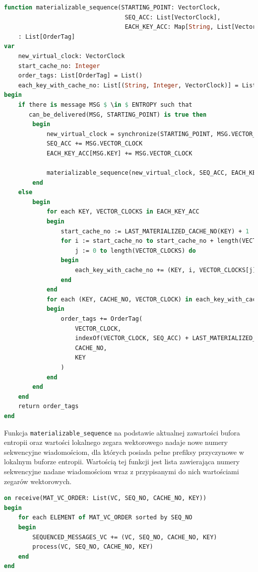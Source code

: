 \begin{lstlisting}[language=Pascal, caption=Pseudokod funkcji konstruującej listę nowych numerów sekwencyjnych wiadomościom z bufora entropii, mathescape=true]
function materializable_sequence(STARTING_POINT: VectorClock, 
                                  SEQ_ACC: List[VectorClock], 
                                  EACH_KEY_ACC: Map[String, List[VectorClock]])
    : List[OrderTag]
var
    new_virtual_clock: VectorClock
    start_cache_no: Integer
    order_tags: List[OrderTag] = List()
    each_key_with_cache_no: List[(String, Integer, VectorClock)] = List()
begin
    if there is message MSG $ \in $ ENTROPY such that 
       can_be_delivered(MSG, STARTING_POINT) is true then
        begin
            new_virtual_clock = synchronize(STARTING_POINT, MSG.VECTOR_CLOCK)
            SEQ_ACC += MSG.VECTOR_CLOCK
            EACH_KEY_ACC[MSG.KEY] += MSG.VECTOR_CLOCK
            
            materializable_sequence(new_virtual_clock, SEQ_ACC, EACH_KEY_ACC)
        end
    else
        begin
            for each KEY, VECTOR_CLOCKS in EACH_KEY_ACC
            begin
                start_cache_no := LAST_MATERIALIZED_CACHE_NO(KEY) + 1
                for i := start_cache_no to start_cache_no + length(VECTOR_CLOCKS),
                    j := 0 to length(VECTOR_CLOCKS) do
                begin
                    each_key_with_cache_no += (KEY, i, VECTOR_CLOCKS[j])
                end
            end
            for each (KEY, CACHE_NO, VECTOR_CLOCK) in each_key_with_cache_no do
            begin
                order_tags += OrderTag(
                    VECTOR_CLOCK, 
                    indexOf(VECTOR_CLOCK, SEQ_ACC) + LAST_MATERIALIZED_SEQ_NO + 1, 
                    CACHE_NO, 
                    KEY
                )
            end
        end
    end
    return order_tags
end
\end{lstlisting}

Funkcja \texttt{materializable\_sequence} na podstawie aktualnej zawartości bufora entropii oraz wartości lokalnego zegara wektorowego nadaje nowe numery sekwencyjne wiadomościom, dla których posiada pełne prefiksy przyczynowe w lokalnym buforze entropii. Wartością tej funkcji jest lista zawierająca numery sekwencyjne nadane wiadomościom wraz z przypisanymi do nich wartościami zegarów wektorowych.

\begin{lstlisting}[language=Pascal, caption=Pseudokod obsługi wiadomości zawierającej porządek sekwencyjny dla operacji zapisów w systemie, mathescape=true]
on receive(MAT_VC_ORDER: List(VC, SEQ_NO, CACHE_NO, KEY))
begin
    for each ELEMENT of MAT_VC_ORDER sorted by SEQ_NO
    begin
        SEQUENCED_MESSAGES_VC += (VC, SEQ_NO, CACHE_NO, KEY)
        process(VC, SEQ_NO, CACHE_NO, KEY)
    end
end
\end{lstlisting}

